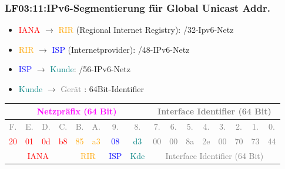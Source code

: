 \begin{frame}[fragile]  
  \frametitle{LF03:11:IPv6-Segmentierung für Global Unicast Addr.}
  \vspace{0.2cm}
  \begin{tiny}

  \begin{itemize}
    \item \textcolor{red}{IANA} $\rightarrow$ \textcolor{orange}{RIR} (Regional Internet Registry): /32-Ipv6-Netz
    \item \textcolor{orange}{RIR} $\rightarrow$ \textcolor{blue}{ISP} (Internetprovider): /48-IPv6-Netz
    \item \textcolor{blue}{ISP} $\rightarrow$ \textcolor{teal}{Kunde}: /56-IPv6-Netz
    \item \textcolor{teal}{Kunde} $\rightarrow$ \textcolor{gray}{Gerät} : 64Bit-Identifier
  \end{itemize}


  \begin{center}
    \renewcommand{\arraystretch}{3}
    \begin{tabular}{|c|c|c|c|c|c|c|c|c|c|c|c|c|c|c|c|}
    \hline
     \multicolumn{8}{|c|}{\footnotesize{\textcolor{magenta}{Netzpräfix (64 Bit)}}} &
     \multicolumn{8}{c|}{\footnotesize{\textcolor{gray}{Interface Identifier (64 Bit)}}}\\
    \hline
    \textcolor{gray}{\tiny{F.}} & \textcolor{gray}{\tiny{E.}} &
        \textcolor{gray}{\tiny{D.}} & \textcolor{gray}{\tiny{C.}} &
          \textcolor{gray}{\tiny{B.}} & \textcolor{gray}{\tiny{A.}} &
            \textcolor{gray}{\tiny{9.}} & \textcolor{gray}{\tiny{8.}} &
              \textcolor{gray}{\tiny{7.}} & \textcolor{gray}{\tiny{6.}} &
                \textcolor{gray}{\tiny{5.}} & \textcolor{gray}{\tiny{4.}} &
                  \textcolor{gray}{\tiny{3.}} & \textcolor{gray}{\tiny{2.}} &
                   \textcolor{gray}{\tiny{1.}} & \textcolor{gray}{\tiny{0.}} \\

    \hline
    \textcolor{red}{\tiny{20}} & \textcolor{red}{\tiny{01}} &
        \textcolor{red}{\tiny{0d}} & \textcolor{red}{\tiny{b8}} &
          \textcolor{orange}{\tiny{85}} & \textcolor{orange}{\tiny{a3}} &
            \textcolor{blue}{\tiny{08}} & \textcolor{teal}{\tiny{d3}} &
              \textcolor{gray}{\tiny{00}} & \textcolor{gray}{\tiny{00}} &
                \textcolor{gray}{\tiny{8a}} & \textcolor{gray}{\tiny{2e}} &
                  \textcolor{gray}{\tiny{00}} & \textcolor{gray}{\tiny{70}} &
                   \textcolor{gray}{\tiny{73}} & \textcolor{gray}{\tiny{44}} \\
    \hline
     \multicolumn{4}{|c|}{\footnotesize{\textcolor{red}{IANA}}} &
     \multicolumn{2}{c|}{\footnotesize{\textcolor{orange}{RIR}}} &
     \multicolumn{1}{c|}{\footnotesize{\textcolor{blue}{ISP}}} &
     \multicolumn{1}{c|}{\footnotesize{\textcolor{teal}{Kde}}} &
     \multicolumn{8}{c|}{\footnotesize{\textcolor{gray}{Interface Identifier (64 Bit)}}}\\   
     

\end{tabular}
\end{center}
\end{tiny}
\end{frame}
